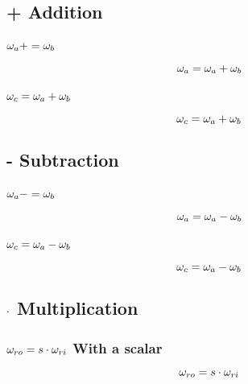 \subsection{+ Addition}
\subsubsection*{$\omega_{a} += \omega_{b}$}
\begin{equation}
\omega_{a} = \omega_{a} + \omega_{b}
\end{equation}

\subsubsection*{$\omega_{c} = \omega_{a} + \omega_{b}$}
\begin{equation}
\omega_{c} = \omega_{a} + \omega_{b}
\end{equation}



\subsection{- Subtraction}
\subsubsection*{$\omega_{a} -= \omega_{b}$}
\begin{equation}
\omega_{a} = \omega_{a} - \omega_{b}
\end{equation}

\subsubsection*{$\omega_{c} = \omega_{a} - \omega_{b}$}
\begin{equation}
\omega_{c} = \omega_{a} - \omega_{b}
\end{equation}



\subsection{$\cdot$ Multiplication}
\subsubsection*{$\omega_{ro} = s \cdot \omega_{ri}$ With a scalar}
\begin{equation}
\omega_{ro} = s \cdot \omega_{ri}
\end{equation}

